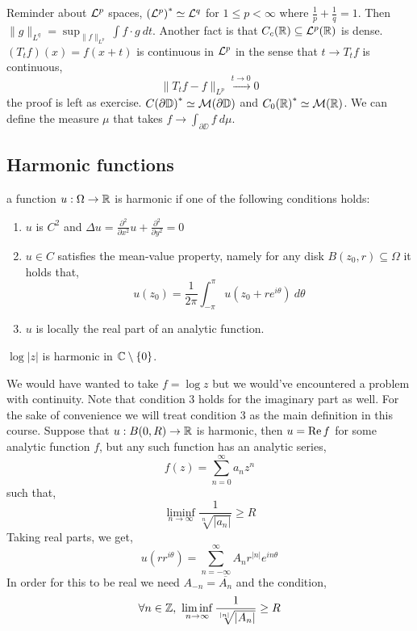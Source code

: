 Reminder about $\mathcal{L}^p$ spaces, ${(\mathcal{L}^p)}^* \simeq \mathcal{L}^q$ for $1 \le p < \infty$ where $\frac{1}{p} + \frac{1}{q} = 1$.
Then $\lVert g \rVert_{L^q} = \sup_{\lVert f \rVert_{L^p}} \int f \cdot g\ dt$. Another fact is that $C_c(\mathbb{R}) \subseteq \mathcal{L}^p(\mathbb{R})$ is dense.
$(T_t f)(x) = f(x + t)$ is continuous in $\mathcal{L}^p$ in the sense that $t \to T_t f$ is continuous,
\[
	\lVert T_t f - f \rVert_{L^p} \xrightarrow{t \to 0} 0
\]
the proof is left as exercise.
$C {(\partial \mathbb{D})}^* \simeq \mathcal{M}(\partial \mathbb{D})$ and $C_0 {(\mathbb{R})}^* \simeq \mathcal{M}(\mathbb{R})$.
We can define the measure $\mu$ that takes $f \to \int_{\partial \DD} f\ d \mu$.

\subsection{Harmonic functions}
\begin{definition}
	a function $u : \Omega \to \mathbb{R}$ is harmonic if one of the following conditions holds:
	\begin{enumerate}
		\item $u$ is $C^2$ and $\Delta u = \frac{\partial^2}{\partial x^2} u + \frac{\partial^2}{\partial y^2} = 0$
		\item $u \in C$ satisfies the mean-value property, namely for any disk $B(z_0, r) \subseteq \Omega$ it holds that,
			\[
				u(z_0)
				= \frac{1}{2 \pi} \int_{- \pi}^{\pi} u(z_0 + r e^{i \theta})\ d \theta
			\]
		\item $u$ is locally the real part of an analytic function.
	\end{enumerate}
\end{definition}
\begin{example}
	$\log |z|$ is harmonic in $\mathbb{C} \setminus \{ 0 \}$.
\end{example}
We would have wanted to take $f = \log z$ but we would've encountered a problem with continuity.
Note that condition 3 holds for the imaginary part as well.
For the sake of convenience we will treat condition 3 as the main definition in this course.
Suppose that $u : B(0, R) \to \mathbb{R}$ is harmonic, then $u = \operatorname{Re} f$ for some analytic function $f$, but any such function has an analytic series,
\[
	f(z)
	= \sum_{n = 0}^\infty a_n z^n
\]
such that,
\[
	\liminf_{n \to \infty} \frac{1}{\sqrt[n]{|a_n|}}
	\ge R
\]
Taking real parts, we get,
\[
	u(r r^{i \theta})
	= \sum_{n = -\infty}^\infty A_n r^{|n|} e^{i n \theta}
\]
In order for this to be real we need $A_{-n} = \overline{A_n}$ and the condition,
\[
	\forall n \in \ZZ,\ 
	\liminf_{n \to \infty} \frac{1}{\sqrt[|n|]{|A_n|}}
	\ge R
\]

